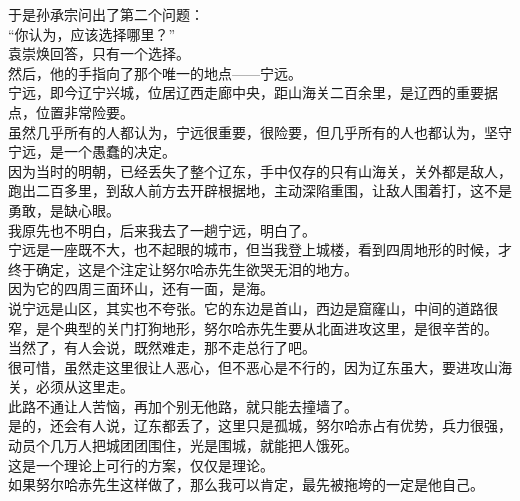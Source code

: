 \begin{multicols}{\theparacolNo}
于是孙承宗问出了第二个问题：\\

“你认为，应该选择哪里？”\\

袁崇焕回答，只有一个选择。\\

然后，他的手指向了那个唯一的地点——宁远。\\

宁远，即今辽宁兴城，位居辽西走廊中央，距山海关二百余里，是辽西的重要据点，位置非常险要。\\

虽然几乎所有的人都认为，宁远很重要，很险要，但几乎所有的人也都认为，坚守宁远，是一个愚蠢的决定。\\

因为当时的明朝，已经丢失了整个辽东，手中仅存的只有山海关，关外都是敌人，跑出二百多里，到敌人前方去开辟根据地，主动深陷重围，让敌人围着打，这不是勇敢，是缺心眼。\\

我原先也不明白，后来我去了一趟宁远，明白了。\\

宁远是一座既不大，也不起眼的城市，但当我登上城楼，看到四周地形的时候，才终于确定，这是个注定让努尔哈赤先生欲哭无泪的地方。\\

因为它的四周三面环山，还有一面，是海。\\

说宁远是山区，其实也不夸张。它的东边是首山，西边是窟窿山，中间的道路很窄，是个典型的关门打狗地形，努尔哈赤先生要从北面进攻这里，是很辛苦的。\\

当然了，有人会说，既然难走，那不走总行了吧。\\

很可惜，虽然走这里很让人恶心，但不恶心是不行的，因为辽东虽大，要进攻山海关，必须从这里走。\\

此路不通让人苦恼，再加个别无他路，就只能去撞墙了。\\

是的，还会有人说，辽东都丢了，这里只是孤城，努尔哈赤占有优势，兵力很强，动员个几万人把城团团围住，光是围城，就能把人饿死。\\

这是一个理论上可行的方案，仅仅是理论。\\

如果努尔哈赤先生这样做了，那么我可以肯定，最先被拖垮的一定是他自己。\\


\end{multicols}

